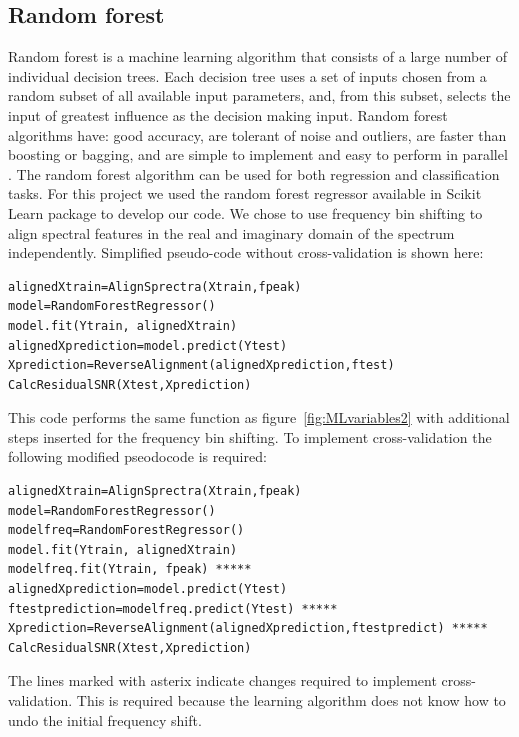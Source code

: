 \subsection{Random forest}
\label{RFsetup}
Random forest is a machine learning algorithm that consists of a large number of individual decision trees. Each decision tree uses a set of inputs chosen from a random subset of all available input parameters, and, from this subset, selects the input of greatest influence as the decision making input. Random forest algorithms have: good accuracy, are tolerant of noise and outliers, are faster than boosting or bagging, and are simple to implement and easy to perform in parallel \cite{Breiman2001}. The random forest algorithm can be used for both regression and classification tasks. For this project we used the random forest regressor available in Scikit Learn package\cite{scikit-learn} to develop our code. We chose to use frequency bin shifting to align spectral features in the real and imaginary domain of the spectrum independently. Simplified pseudo-code without cross-validation is shown here:
\begin{lstlisting}[basicstyle=\small]
alignedXtrain=AlignSprectra(Xtrain,fpeak)
model=RandomForestRegressor()
model.fit(Ytrain, alignedXtrain)
alignedXprediction=model.predict(Ytest)
Xprediction=ReverseAlignment(alignedXprediction,ftest)
CalcResidualSNR(Xtest,Xprediction)
\end{lstlisting}
This code performs the same function as figure~\ref{fig:MLvariables2} with additional steps inserted for the frequency bin shifting.
To implement cross-validation the following modified pseodocode is required:
\begin{lstlisting}[basicstyle=\small]
alignedXtrain=AlignSprectra(Xtrain,fpeak)
model=RandomForestRegressor()
modelfreq=RandomForestRegressor()
model.fit(Ytrain, alignedXtrain)
modelfreq.fit(Ytrain, fpeak) *****
alignedXprediction=model.predict(Ytest)
ftestprediction=modelfreq.predict(Ytest) *****
Xprediction=ReverseAlignment(alignedXprediction,ftestpredict) *****
CalcResidualSNR(Xtest,Xprediction)
\end{lstlisting}
The lines marked with asterix indicate changes required to implement cross-validation. This is required because the learning algorithm does not know how to undo the initial frequency shift.

